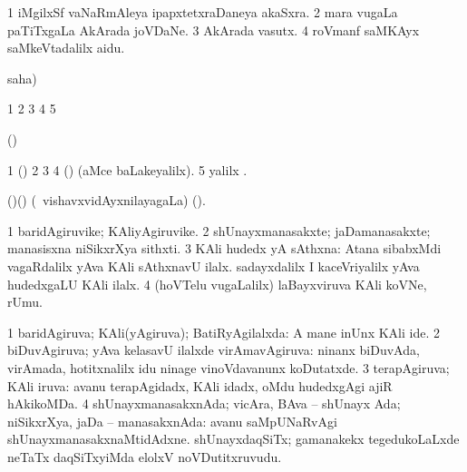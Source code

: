 \bentry
{}
\gl{\nA}
\bmng
\bnum
\num{1} iMgilxSf vaNaRmAleya ipapxtetxraDaneya akaSxra. 
\num{2} mara \mo vugaLa paTiTxgaLa  AkArada joVDaNe. 
\num{3}  AkArada vasutx. 
\num{4} roVmanf saMKAyx saMkeVtadalilx aidu. 
\enum
\emng
\eentry

\bentry
{}
\gl{\saMkiSx}
\expl{}
\bmng
  saha)  
\emng
\eentry

\bentry
{}
\gl{\saMkiSx}
\expl{}
\bmng
\bnum
\num{1}  
\num{2}  
\num{3}  
\num{4}  
\num{5}  
\enum
\emng
\eentry

\bentry
{}
\gl{\saMkeV}
\expl{}
\bmng
 (\ravi)  
\emng
\eentry

\bentry
{}
\gl{\saMkiSx}
\expl{}
\bmng
\bnum
\num{1} (\ame)  
\num{2}  
\num{3}  
\num{4} (\ame)  (aMce baLakeyalilx). 
\num{5} \UK yalilx . 
\enum
\emng
\eentry

\bentry
{}
\gl{\saMkiSx}
\expl{}
\bmng
\emng
\eentry

\bentry
{}
\gl{\nA}
\expl{}
\bmng
 (\birx)(\AmA) (\kanmu\ vishavxvidAyxnilayagaLa)  (\saMkiSx). 
\emng
\eentry

\bentry
{} 
\gl{\nA}
\bmng
\bnum
\num{1} baridAgiruvike; KAliyAgiruvike. 
\num{2} shUnayxmanasakxte; jaDamanasakxte; manasisxna niSikxrXya sithxti. 
\num{3} KAli hudedx yA sAthxna:  Atana sibabxMdi vagaRdalilx yAva KAli sAthxnavU ilalx.  sadayxdalilx I kaceVriyalilx yAva hudedxgaLU KAli ilalx. 
\num{4} (hoVTelu \mo vugaLalilx) laBayxviruva KAli koVNe, rUmu. 
\enum
\emng
\eentry

\bentry
{} 
\gl{\gu}
\expl{}
\bmng
\bnum
\num{1} baridAgiruva; KAli(yAgiruva); BatiRyAgilalxda:  A mane inUnx KAli ide. 
\num{2} biDuvAgiruva; yAva kelasavU ilalxde virAmavAgiruva:  ninanx biDuvAda, virAmada, hotitxnalilx idu ninage vinoVdavanunx koDutatxde. 
\num{3} terapAgiruva; KAli iruva:  avanu terapAgidadx, KAli idadx, oMdu hudedxgAgi ajiR hAkikoMDa. 
\num{4} shUnayxmanasakxnAda; vicAra, BAva -- shUnayx Ada; niSikxrXya, jaDa -- manasakxnAda:  avanu saMpUNaRvAgi shUnayxmanasakxnaMtidAdxne.  shUnayxdaqSiTx; gamanakekx tegedukoLaLxde neTaTx daqSiTxyiMda elolxV noVDutitxruvudu. 
\enum
\emng
\eentry

